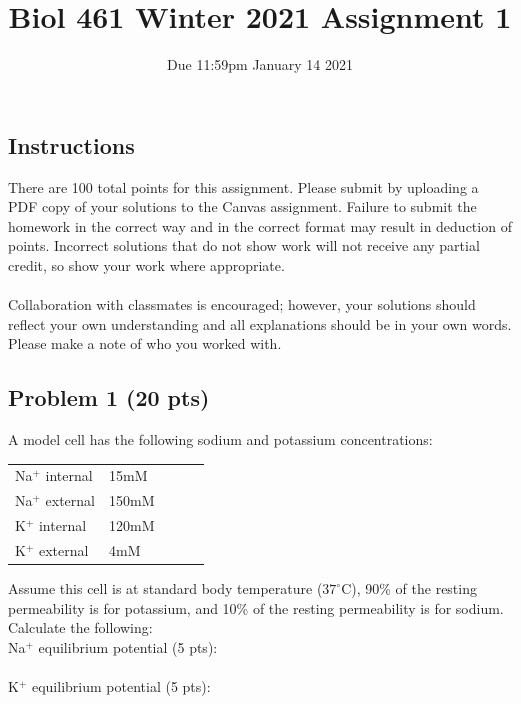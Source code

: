 \documentclass{article}
\title{Biol 461 Winter 2021 Assignment 1}
\author{Due 11:59pm January 14 2021}
\date{}
\begin{document}
\maketitle

\subsection*{Instructions}
There are 100 total points for this assignment. Please submit by uploading a PDF copy of your solutions to the Canvas assignment. Failure to submit the homework in the correct way and in the correct format may result in deduction of points. Incorrect solutions that do not show work will not receive any partial credit, so show your work where appropriate. \\\\
Collaboration with classmates is encouraged; however, your solutions should reflect your own understanding and all explanations should be in your own words. Please make a note of who you worked with.

\subsection*{Problem 1 (20 pts)}
A model cell has the following sodium and potassium concentrations:
\begin{table}[h]
\begin{tabular}{lllll}
Na$^+$ internal & 15mM   \\
Na$^+$ external & 150mM  \\
K$^+$ internal  & 120mM \\
K$^+$ external  & 4mM
\end{tabular}
\end{table}

\noindent Assume this cell is at standard body temperature ($37^{\circ}$C), 90\% of the resting permeability is for potassium, and 10\% of the resting permeability is for sodium. Calculate the following:\\

Na$^+$ equilibrium potential (5 pts):\\\\

K$^+$ equilibrium potential (5 pts):\\\\
\end{document}
